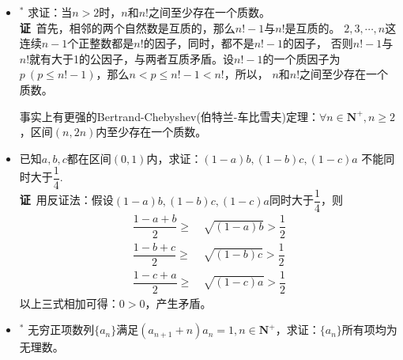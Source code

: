 \begin{itemize}[leftmargin=\inteval{\myitemleftmargin}pt,itemsep=
   \inteval{\myitemitempsep}pt,topsep=\inteval{\myitemtopsep}pt]
\item $ ^* $ 求证：当$ n>2 $时，$ n $和$ n! $之间至少存在一个质数。\\
\textbf{证}\ 首先，相邻的两个自然数是互质的，那么$ n!-1 $与$ n! $是互质的。
$ 2,3,\cdots,n $这连续$ n-1 $个正整数都是$ n! $的因子，同时，都不是$ n!-1 $的因子，
否则$ n!-1 $与$ n! $就有大于1的公因子，与两者互质矛盾。设$ n!-1 $的一个质因子为
$ p\ (p\leq n!-1) $，那么$ n<p\leq n!-1<n! $，所以，
$ n $和$ n! $之间至少存在一个质数。

事实上有更强的Bertrand-Chebyshev(伯特兰-车比雪夫)定理：$ \forall n\in \textbf{N}^+,n\geq 2 $，区间$ (n,2n) $内至少存在一个质数。

\item 已知$ a,b,c $都在区间$ (0,1) $内，求证：$ (1-a)b,(1-b)c,(1-c)a $
不能同时大于$ \dfrac{1}{4} $.  \\
\textbf{证}\ 用反证法：假设$ (1-a)b,(1-b)c,(1-c)a $同时大于$ \dfrac{1}{4} $，则
\begin{align*}
    \dfrac{1-a+b}{2} \geq &\ \sqrt{(1-a)b}>\dfrac{1}{2} \\
    \dfrac{1-b+c}{2} \geq &\ \sqrt{(1-b)c}>\dfrac{1}{2} \\
    \dfrac{1-c+a}{2} \geq &\ \sqrt{(1-c)a}>\dfrac{1}{2}      
\end{align*}
以上三式相加可得：$ 0>0 $，产生矛盾。 

\item $ ^* $ 无穷正项数列$ \{a_n\} $满足$ (a_{n+1}+n)a_n=1,n\in 
\textbf{N}^+ $，求证：$ \{a_n\} $所有项均为无理数。

\end{itemize}

